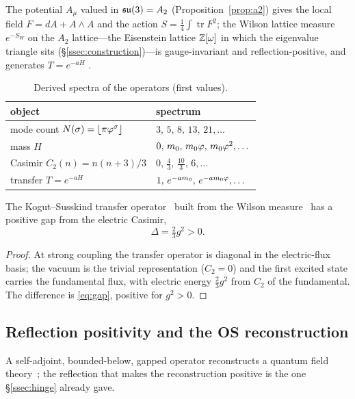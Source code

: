 \begin{proposition}\label{prop:localfield}
The potential $A_\mu$ valued in $\mathfrak{su}(3)=A_2$ (Proposition~\ref{prop:a2}) gives the local field
$F=dA+A\wedge A$ and the action $S=\tfrac1{4}\int\operatorname{tr}F^2$; the Wilson lattice measure
$e^{-S_W}$ on the $A_2$ lattice---the Eisenstein lattice $\mathbb{Z}[\omega]$ in which the eigenvalue
triangle sits (\S\ref{ssec:construction})---is gauge-invariant and reflection-positive, and generates
$T=e^{-aH}$ .
\end{proposition}

\begin{table}[htb]\centering\footnotesize
\caption{Derived spectra of the operators (first values).}\label{tab:spectra}
\begin{tabular}{ll}\hline
object & spectrum\\\hline
mode count $N(\sigma)=\lfloor\pi\varphi^\sigma\rfloor$ & $3,\,5,\,8,\,13,\,21,\dots$\\
mass $H$ & $0,\,m_0,\,m_0\varphi,\,m_0\varphi^2,\dots$\\
Casimir $C_2(n)=n(n+3)/3$ & $0,\,\tfrac43,\,\tfrac{10}3,\,6,\dots$\\
transfer $T=e^{-aH}$ & $1,\,e^{-am_0},\,e^{-am_0\varphi},\dots$\\\hline
\end{tabular}\end{table}

\begin{theorem}\label{thm:gap}
The Kogut--Susskind transfer operator~\cite{KogutSusskind} built from the Wilson measure~\cite{Wilson} has a positive gap from the electric Casimir,
\begin{equation}\label{eq:gap}
  \Delta=\tfrac23 g^2>0. 
\end{equation}
\end{theorem}
\begin{proof}
At strong coupling the transfer operator is diagonal in the electric-flux basis; the vacuum is the
trivial representation ($C_2=0$) and the first excited state carries the fundamental flux, with
electric energy $\tfrac23 g^2$ from $C_2$ of the fundamental. The difference is \eqref{eq:gap},
positive for $g^2>0$.
\end{proof}

\subsection{Reflection positivity and the OS reconstruction}\label{ssec:os}
A self-adjoint, bounded-below, gapped operator reconstructs a quantum field theory~\cite{OsterwalderSchrader}; the reflection
that makes the reconstruction positive is the one \S\ref*{ssec:hinge} already gave.

